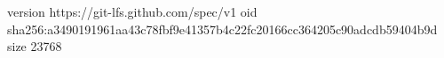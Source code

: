 version https://git-lfs.github.com/spec/v1
oid sha256:a3490191961aa43c78fbf9e41357b4c22fc20166cc364205c90adcdb59404b9d
size 23768
